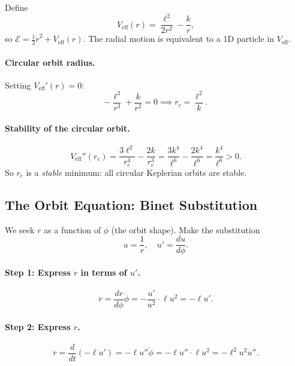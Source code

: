 \documentclass[12pt,a4paper]{article}
\theoremstyle{plain}
\theoremstyle{definition}
\theoremstyle{remark}
\begin{document}
Define
\[
  V_{\mathrm{eff}}(r) = \frac{\ell^2}{2r^2} - \frac{k}{r},
\]
so $\mathcal{E} = \tfrac{1}{2}\dot{r}^2 + V_{\mathrm{eff}}(r)$. The radial motion is equivalent to a 1D particle in $V_{\mathrm{eff}}$.

\paragraph{Circular orbit radius.} Setting $V_{\mathrm{eff}}'(r)=0$:
\[
  -\frac{\ell^2}{r^3}+\frac{k}{r^2}=0
  \implies
  r_c = \frac{\ell^2}{k}.
\]

\paragraph{Stability of the circular orbit.}
\[
  V_{\mathrm{eff}}''(r_c)
  = \frac{3\ell^2}{r_c^4}-\frac{2k}{r_c^3}
  = \frac{3k^4}{\ell^6}-\frac{2k^4}{\ell^6}
  = \frac{k^4}{\ell^6} > 0.
\]
So $r_c$ is a \textit{stable} minimum: all circular Keplerian orbits are stable.

\subsection{The Orbit Equation: Binet Substitution}

We seek $r$ as a function of $\phi$ (the orbit shape). Make the substitution
\[
  u = \frac{1}{r}, \quad u' = \frac{du}{d\phi}.
\]

\paragraph{Step 1: Express $\dot r$ in terms of $u'$.}
\[
  \dot{r} = \frac{dr}{d\phi}\dot\phi = -\frac{u'}{u^2}\cdot\ell u^2 = -\ell u'.
\]

\paragraph{Step 2: Express $\ddot r$.}
\[
  \ddot{r} = \frac{d}{dt}(-\ell u') = -\ell u''\dot\phi = -\ell u''\cdot\ell u^2 = -\ell^2 u^2 u''.
\]
\end{document}
